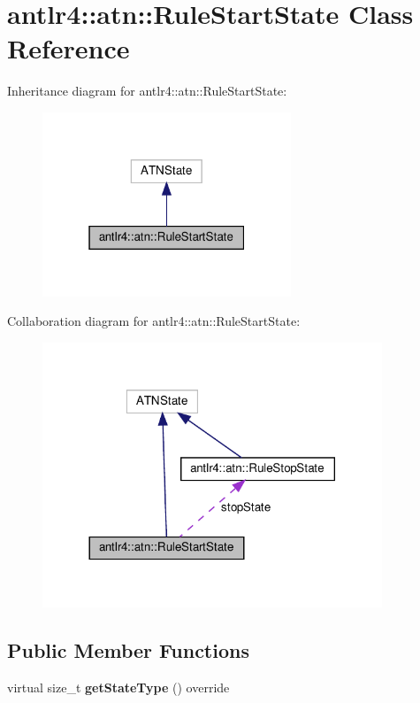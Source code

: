 \hypertarget{classantlr4_1_1atn_1_1RuleStartState}{}\section{antlr4\+:\+:atn\+:\+:Rule\+Start\+State Class Reference}
\label{classantlr4_1_1atn_1_1RuleStartState}


Inheritance diagram for antlr4\+:\+:atn\+:\+:Rule\+Start\+State\+:
\nopagebreak
\begin{figure}[H]
\begin{center}
\leavevmode
\includegraphics[width=211pt]{classantlr4_1_1atn_1_1RuleStartState__inherit__graph}
\end{center}
\end{figure}


Collaboration diagram for antlr4\+:\+:atn\+:\+:Rule\+Start\+State\+:
\nopagebreak
\begin{figure}[H]
\begin{center}
\leavevmode
\includegraphics[width=288pt]{classantlr4_1_1atn_1_1RuleStartState__coll__graph}
\end{center}
\end{figure}
\subsection*{Public Member Functions}
\begin{DoxyCompactItemize}
\item 
\mbox{\label{classantlr4_1_1atn_1_1RuleStartState_a719f07a1fcf9a70e2f904505560b8d1d}} 
virtual size\+\_\+t {\bfseries get\+State\+Type} () override
\end{DoxyCompactItemize}
